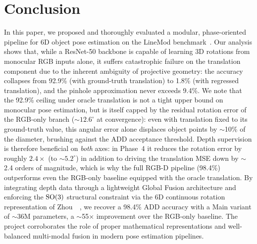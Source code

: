 \section{Conclusion}
\label{sec:conclusion}

In this paper, we proposed and thoroughly evaluated a modular, phase-oriented pipeline for 6D object pose estimation on the LineMod benchmark~\cite{hinterstoisser2012model}. Our analysis shows that, while a ResNet-50 backbone is capable of learning 3D rotations from monocular RGB inputs alone, it suffers catastrophic failure on the translation component due to the inherent ambiguity of projective geometry: the accuracy collapses from 92.9\% (with ground-truth translation) to 1.8\% (with regressed translation), and the pinhole approximation never exceeds 9.4\%. We note that the 92.9\% ceiling under oracle translation is not a tight upper bound on monocular pose estimation, but is itself capped by the residual rotation error of the RGB-only branch ($\sim 12.6^\circ$ at convergence): even with translation fixed to its ground-truth value, this angular error alone displaces object points by $\sim$10\% of the diameter, brushing against the ADD acceptance threshold. Depth supervision is therefore beneficial on \emph{both} axes: in Phase~4 it reduces the rotation error by roughly $2.4\times$ (to $\sim 5.2^\circ$) in addition to driving the translation MSE down by $\sim$2.4 orders of magnitude, which is why the full RGB-D pipeline (98.4\%) outperforms even the RGB-only baseline equipped with the oracle translation. By integrating depth data through a lightweight Global Fusion architecture and enforcing the $\mathrm{SO}(3)$ structural constraint via the 6D continuous rotation representation of Zhou~\etal~\cite{zhou2019continuity}, we recover a 98.4\% ADD accuracy with a Main variant of $\sim$36M parameters, a $\sim$55$\times$ improvement over the RGB-only baseline. The project corroborates the role of proper mathematical representations and well-balanced multi-modal fusion in modern pose estimation pipelines.

